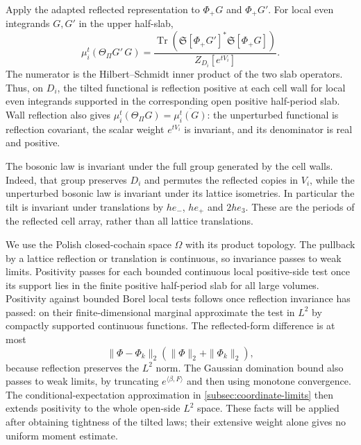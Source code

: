 Apply the adapted reflected representation to $\Phi_+G$ and
$\Phi_+G'$. For local even integrands $G,G'$ in the upper half-slab,
\begin{equation}\label{eq:diag-tilted-positive-form}
 \mu_i^t(\Theta_\Pi G'\,G)=
 \frac{\operatorname{Tr}
          (\mathfrak S[\Phi_+G']^*\mathfrak S[\Phi_+G])}
      {Z_{D_i}[e^{tV_i}]}.
\end{equation}
The numerator is the Hilbert--Schmidt inner product of the two slab
operators. Thus, on $D_i$, the tilted functional is reflection positive
at each cell wall for local even integrands supported in the corresponding
open positive half-period slab. Wall reflection also gives
$\mu_i^t(\Theta_\Pi G)=\overline{\mu_i^t(G)}$: the unperturbed
functional is reflection covariant, the scalar weight $e^{tV_i}$
is invariant, and its denominator is real and positive.

The bosonic law is invariant under the full group generated by the
cell walls. Indeed, that group preserves $D_i$ and permutes the
reflected copies in $V_i$, while the unperturbed bosonic law is
invariant under its lattice isometries. In particular the tilt is
invariant under translations by $he_-$, $he_+$ and $2he_3$.
These are the periods of the reflected cell array, rather than all
lattice translations.

We use the Polish closed-cochain space $\Omega$ with its product
topology. The pullback by a lattice reflection or
translation is continuous, so invariance passes to weak limits.
Positivity passes for each bounded continuous local positive-side test
once its support lies in the finite positive half-period slab for all
large volumes. Positivity against bounded Borel local tests follows once reflection invariance
has passed: on their finite-dimensional marginal approximate the
test in $L^2$ by compactly supported continuous functions. The
reflected-form difference is at most
\[
 \|\Phi-\Phi_k\|_2(\|\Phi\|_2+\|\Phi_k\|_2),
\]
because reflection preserves the $L^2$ norm. The Gaussian domination
bound also passes to weak limits, by truncating
$e^{\langle\beta,F\rangle}$ and then using monotone convergence.
The conditional-expectation approximation in
\cref{subsec:coordinate-limits} then extends positivity to the whole
open-side $L^2$ space. These facts will be applied after obtaining tightness of the tilted
laws; their extensive weight alone gives no uniform moment estimate.

